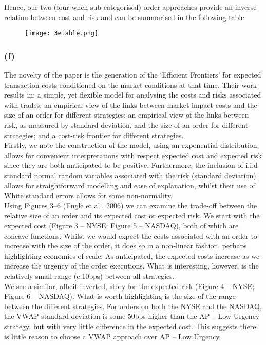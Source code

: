 \documentclass{article}
\begin{document}
Hence, our two (four when sub-categorised) order approaches provide an inverse relation between cost and risk and can be summarised in the following table. \\

\begin{figure}[h]
\texttt{[image: 3etable.png]}
\centering
\end{figure}


\subsubsection*{(f)}
The novelty of the paper is the generation of the ‘Efficient Frontiers’ for expected transaction costs conditioned on the market conditions at that time. Their work results in: a simple, yet flexible model for analysing the costs and risks associated with trades; an empirical view of the links between market impact costs and the size of an order for different strategies; an empirical view of the links between risk, as measured by standard deviation, and the size of an order for different strategies; and a cost-risk frontier for different strategies. \\

Firstly, we note the construction of the model, using an exponential distribution, allows for convenient interpretations with respect expected cost and expected risk since they are both anticipated to be positive. Furthermore, the inclusion of i.i.d standard normal random variables associated with the risk (standard deviation) allows for straightforward modelling and ease of explanation, whilst their use of White standard errors allows for some non-normality. \\

Using Figures 3–6 (Engle et al., 2006) we can examine the trade-off between the relative size of an order and its expected cost or expected risk. We start with the expected cost (Figure 3 – NYSE; Figure 5 – NASDAQ), both of which are concave functions. Whilst we would expect the costs associated with an order to increase with the size of the order, it does so in a non-linear fashion, perhaps highlighting economies of scale. As anticipated, the expected costs increase as we increase the urgency of the order executions. What is interesting, however, is the relatively small range (c.10bps) between all strategies. \\

We see a similar, albeit inverted, story for the expected risk (Figure 4 – NYSE; Figure 6 – NASDAQ). What is worth highlighting is the size of the range between the different strategies. For orders on both the NYSE and the NASDAQ, the VWAP standard deviation is some 50bps higher than the AP – Low Urgency strategy, but with very little difference in the expected cost. This suggests there is little reason to choose a VWAP approach over AP – Low Urgency. \\
\end{document}

